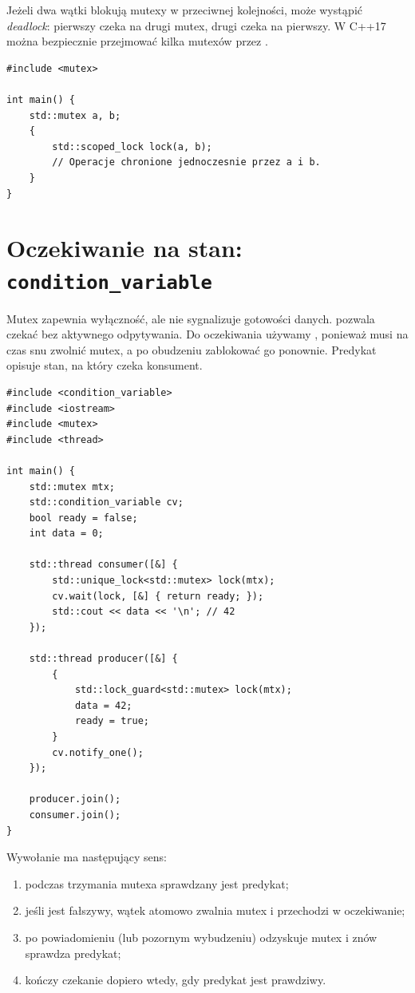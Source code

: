 Jeżeli dwa wątki blokują mutexy w przeciwnej kolejności, może wystąpić
\emph{deadlock}: pierwszy czeka na drugi mutex, drugi czeka na pierwszy.
W C++17 można bezpiecznie przejmować kilka mutexów przez .

\begin{lstlisting}[caption={Łączne przejęcie dwóch mutexów (C++17).}]
#include <mutex>

int main() {
    std::mutex a, b;
    {
        std::scoped_lock lock(a, b);
        // Operacje chronione jednoczesnie przez a i b.
    }
}
\end{lstlisting}


\section{Oczekiwanie na stan: \texttt{condition\_variable}}
\label{sec:cv}

Mutex zapewnia wyłączność, ale nie sygnalizuje gotowości danych.
 pozwala czekać bez aktywnego odpytywania.
Do oczekiwania używamy , ponieważ
 musi na czas snu zwolnić mutex, a po obudzeniu zablokować
go ponownie. Predykat opisuje stan, na który czeka konsument.

\begin{lstlisting}[caption={Producent i konsument z warunkiem gotowości (C++11).}]
#include <condition_variable>
#include <iostream>
#include <mutex>
#include <thread>

int main() {
    std::mutex mtx;
    std::condition_variable cv;
    bool ready = false;
    int data = 0;

    std::thread consumer([&] {
        std::unique_lock<std::mutex> lock(mtx);
        cv.wait(lock, [&] { return ready; });
        std::cout << data << '\n'; // 42
    });

    std::thread producer([&] {
        {
            std::lock_guard<std::mutex> lock(mtx);
            data = 42;
            ready = true;
        }
        cv.notify_one();
    });

    producer.join();
    consumer.join();
}
\end{lstlisting}

Wywołanie  ma następujący sens:
\begin{enumerate}
\item podczas trzymania mutexa sprawdzany jest predykat;
\item jeśli jest fałszywy, wątek atomowo zwalnia mutex i przechodzi w oczekiwanie;
\item po powiadomieniu (lub pozornym wybudzeniu) odzyskuje mutex i znów sprawdza predykat;
\item kończy czekanie dopiero wtedy, gdy predykat jest prawdziwy.
\end{enumerate}

